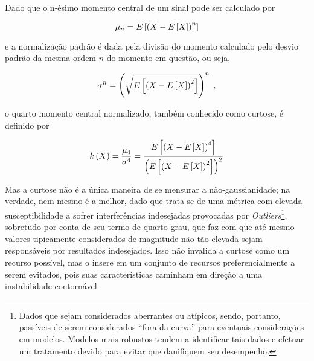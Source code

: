 \begin{definition}[Curtose]
    Dado que o n-ésimo momento central de um sinal pode ser calculado por

    \begin{equation}
        \mu_{n} = E\left[\left(X - E\left[X\right]\right)^{n}\right]
        \vspace{0.2cm}
    \end{equation}

    \noindent e a normalização padrão é dada pela divisão do momento calculado pelo desvio padrão da mesma ordem $n$ do momento em questão, ou seja,

    \begin{equation}
        \sigma^{n} = \left(\sqrt{E\left[\left(X - E\left[X\right]\right)^{2}\right]}\right)^{n}
        \hspace{0.1cm},
        \vspace{0.2cm}
    \end{equation}

    o quarto momento central normalizado, também conhecido como curtose, é definido por

    \begin{equation}
        k\left(X\right) = \dfrac{\mu_{4}}{\sigma^{4}} = \dfrac{E\left[\left(X - E\left[X\right]\right)^{4}\right]}{\left(E\left[\left(X - E\left[X\right]\right)^{2}\right]\right)^{2}}
        \vspace{0.2cm}
    \label{eq:bss_curtose}
    \end{equation}

\end{definition}


Mas a curtose não é a única maneira de se mensurar a não-gaussianidade; na verdade, nem mesmo é a melhor, dado que trata-se de uma métrica com elevada susceptibilidade a sofrer interferências indesejadas provocadas por \textit{Outliers}\footnote{Dados que sejam considerados aberrantes ou atípicos, sendo, portanto, passíveis de serem considerados ``fora da curva'' para eventuais considerações em modelos. Modelos mais robustos tendem a identificar tais dados e efetuar um tratamento devido para evitar que danifiquem seu desempenho.}, sobretudo por conta de seu termo de quarto grau, que faz com que até mesmo valores tipicamente considerados de magnitude não tão elevada sejam responsáveis por resultados indesejados. Isso não invalida a curtose como um recurso possível, mas o insere em um conjunto de recursos preferencialmente a serem evitados, pois suas características caminham em direção a uma instabilidade contornável.


